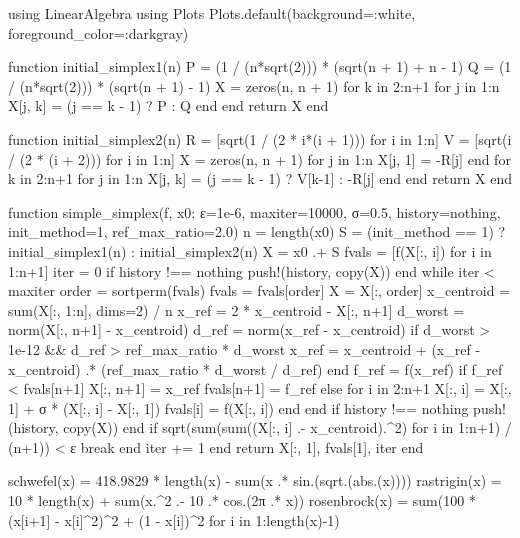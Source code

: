 \documentclass[a4paper, 14pt]{extarticle}
\begin{document}
\begin{breakablelisting}
    using LinearAlgebra
    using Plots
    Plots.default(background=:white, foreground_color=:darkgray)
    
    function initial_simplex1(n)
        P = (1 / (n*sqrt(2))) * (sqrt(n + 1) + n - 1)
        Q = (1 / (n*sqrt(2))) * (sqrt(n + 1) - 1)
        X = zeros(n, n + 1)
        for k in 2:n+1
            for j in 1:n
                X[j, k] = (j == k - 1) ? P : Q
            end
        end
        return X
    end
    
    function initial_simplex2(n)
        R = [sqrt(1 / (2 * i*(i + 1))) for i in 1:n]
        V = [sqrt(i / (2 * (i + 2))) for i in 1:n]
        X = zeros(n, n + 1)
        for j in 1:n
            X[j, 1] = -R[j]
        end
        for k in 2:n+1
            for j in 1:n
                X[j, k] = (j == k - 1) ? V[k-1] : -R[j]
            end
        end
        return X
    end
    
    function simple_simplex(f, x0; ε=1e-6, maxiter=10000, σ=0.5, history=nothing, init_method=1, ref_max_ratio=2.0)
        n = length(x0)
        S = (init_method == 1) ? initial_simplex1(n) : initial_simplex2(n)
        X = x0 .+ S
        fvals = [f(X[:, i]) for i in 1:n+1]
        iter = 0
        if history !== nothing
            push!(history, copy(X))
        end
        while iter < maxiter
            order = sortperm(fvals)
            fvals = fvals[order]
            X = X[:, order]
            x_centroid = sum(X[:, 1:n], dims=2) / n
            x_ref = 2 * x_centroid - X[:, n+1]
            d_worst = norm(X[:, n+1] - x_centroid)
            d_ref = norm(x_ref - x_centroid)
            if d_worst > 1e-12 && d_ref > ref_max_ratio * d_worst
                x_ref = x_centroid + (x_ref - x_centroid) .* (ref_max_ratio * d_worst / d_ref)
            end
            f_ref = f(x_ref)
            if f_ref < fvals[n+1]
                X[:, n+1] = x_ref
                fvals[n+1] = f_ref
            else
                for i in 2:n+1
                    X[:, i] = X[:, 1] + σ * (X[:, i] - X[:, 1])
                    fvals[i] = f(X[:, i])
                end
            end
            if history !== nothing
                push!(history, copy(X))
            end
            if sqrt(sum(sum((X[:, i] .- x_centroid).^2) for i in 1:n+1) / (n+1)) < ε
                break
            end
            iter += 1
        end
        return X[:, 1], fvals[1], iter
    end
    
    schwefel(x) = 418.9829 * length(x) - sum(x .* sin.(sqrt.(abs.(x))))
    rastrigin(x) = 10 * length(x) + sum(x.^2 .- 10 .* cos.(2π .* x))
    rosenbrock(x) = sum(100 * (x[i+1] - x[i]^2)^2 + (1 - x[i])^2 for i in 1:length(x)-1)
    

\end{breakablelisting}
\end{document}
